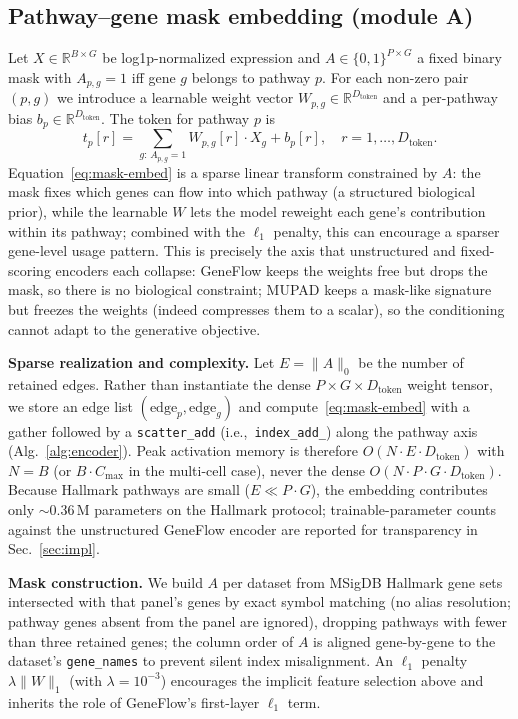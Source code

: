 \documentclass[journal]{IEEEtran}
\newcommand{\ie}{i.e.,}
\begin{document}
\subsection{Pathway--gene mask embedding (module A)}
\label{sec:moduleA}
Let $X\in\mathbb{R}^{B\times G}$ be log1p-normalized expression and
$A\in\{0,1\}^{P\times G}$ a fixed binary mask with $A_{p,g}=1$ iff gene $g$
belongs to pathway $p$. For each non-zero pair $(p,g)$ we introduce a learnable
weight vector $W_{p,g}\in\mathbb{R}^{D_{\text{token}}}$ and a per-pathway bias
$b_p\in\mathbb{R}^{D_{\text{token}}}$. The token for pathway $p$ is
\begin{equation}
t_{p}[r] = \sum_{g:\,A_{p,g}=1} W_{p,g}[r]\cdot X_{g} + b_p[r], \quad r=1,\dots,D_{\text{token}}.
\label{eq:mask-embed}
\end{equation}
Equation~\eqref{eq:mask-embed} is a sparse linear transform constrained by $A$:
the mask fixes which genes can flow into which pathway (a structured biological prior),
while the learnable $W$ lets the model reweight each gene's contribution within
its pathway; combined with the $\ell_1$ penalty, this can encourage a sparser
gene-level usage pattern. This is
precisely the axis that unstructured and fixed-scoring encoders each collapse:
GeneFlow keeps the weights free but drops the mask, so there is no biological
constraint; MUPAD keeps a mask-like signature but freezes the weights (indeed
compresses them to a scalar), so the conditioning cannot adapt to the generative objective.

\textbf{Sparse realization and complexity.} Let $E=\lVert A\rVert_0$ be the number
of retained edges. Rather than instantiate the dense $P\times G\times
D_{\text{token}}$ weight tensor, we store an edge list $(\text{edge}_p,
\text{edge}_g)$ and compute~\eqref{eq:mask-embed} with a gather followed by a
\texttt{scatter\_add} (\ie\ \texttt{index\_add\_}) along the pathway axis
(Alg.~\ref{alg:encoder}). Peak activation memory is therefore
$O(N\!\cdot\!E\!\cdot\!D_{\text{token}})$ with $N=B$ (or $B\!\cdot\!C_{\max}$ in
the multi-cell case), never the dense $O(N\!\cdot\!P\!\cdot\!G\!\cdot\!
D_{\text{token}})$. Because Hallmark pathways are small ($E\ll P\cdot G$), the
embedding contributes only $\sim$0.36\,M parameters on the Hallmark protocol;
trainable-parameter counts against the unstructured GeneFlow encoder are reported
for transparency in Sec.~\ref{sec:impl}.

\textbf{Mask construction.} We build $A$ per dataset from MSigDB Hallmark gene
sets~\cite{hallmark} intersected with that panel's genes by exact symbol matching
(no alias resolution; pathway genes absent from the panel are ignored), dropping
pathways with fewer than three retained genes; the column order of $A$ is aligned gene-by-gene to the dataset's
\texttt{gene\_names} to prevent silent index misalignment. An $\ell_1$ penalty
$\lambda\lVert W\rVert_1$ (with $\lambda=10^{-3}$) encourages the implicit feature
selection above and inherits the role of GeneFlow's first-layer $\ell_1$ term.
\end{document}
